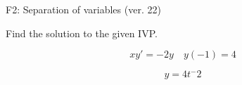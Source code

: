\begin{exercise}
  \begin{exerciseTitle}F2: Separation of variables (ver. 22)\end{exerciseTitle}
  \begin{exerciseStatement}
    
Find the solution to the given IVP.

    
\[xy'= -2 y \hspace{1em} y( -1 ) = 4\]

  \end{exerciseStatement}
  \begin{exerciseAnswer}
    
\[y= 4 t^ -2\]

  \end{exerciseAnswer}
\end{exercise}